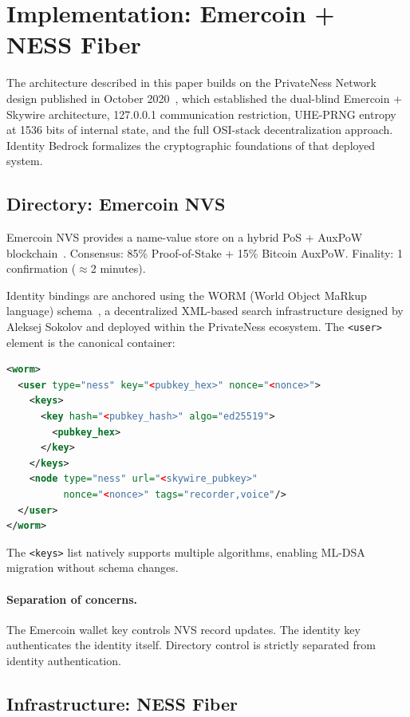 \documentclass[11pt,a4paper]{article}
\theoremstyle{definition}
\begin{document}
\section{Implementation: Emercoin + NESS Fiber}
\label{sec:implementation}

The architecture described in this paper builds on the PrivateNess
Network design published in October 2020~\cite{Litepaper20}, which
established the dual-blind Emercoin + Skywire architecture, 127.0.0.1
communication restriction, UHE-PRNG entropy at 1536 bits of internal
state, and the full OSI-stack decentralization approach. Identity
Bedrock formalizes the cryptographic foundations of that deployed
system.

\subsection{Directory: Emercoin NVS}

Emercoin NVS provides a name-value store on a hybrid PoS + AuxPoW
blockchain~\cite{Emercoin}. Consensus: 85\% Proof-of-Stake + 15\%
Bitcoin AuxPoW. Finality: 1 confirmation ($\approx$2 minutes).

Identity bindings are anchored using the WORM (World Object MaRkup
language) schema~\cite{WORM}, a decentralized XML-based search
infrastructure designed by Aleksej Sokolov and deployed within the
PrivateNess ecosystem. The \texttt{<user>} element is the canonical
container:

\begin{lstlisting}[language=XML]
<worm>
  <user type="ness" key="<pubkey_hex>" nonce="<nonce>">
    <keys>
      <key hash="<pubkey_hash>" algo="ed25519">
        <pubkey_hex>
      </key>
    </keys>
    <node type="ness" url="<skywire_pubkey>"
          nonce="<nonce>" tags="recorder,voice"/>
  </user>
</worm>
\end{lstlisting}

The \texttt{<keys>} list natively supports multiple algorithms,
enabling ML-DSA migration without schema changes.

\paragraph{Separation of concerns.} The Emercoin wallet key controls
NVS record updates. The identity key authenticates the identity
itself. Directory control is strictly separated from identity
authentication.

\subsection{Infrastructure: NESS Fiber}
\end{document}
